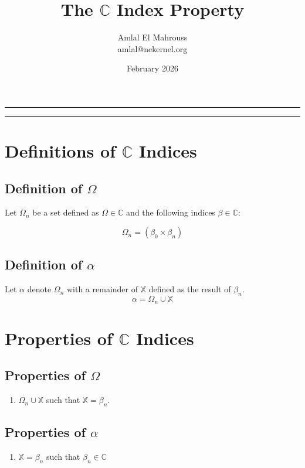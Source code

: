 \documentclass[11pt, a4paper]{article}
\title{The $\mathbb{C}$ Index Property}
\author{Amlal El Mahrouss\\amlal@nekernel.org}
\date{February 2026}
\begin{document}
\bf
\maketitle
\begin{center}
	\rule[0.01cm]{17cm}{0.01cm}
\end{center}
\begin{center}
	\rule[0.01cm]{17cm}{0.01cm}
\end{center}

\section{Definitions of $\mathbb{C}$ Indices}

\subsection{Definition of $\Omega$}

Let $\Omega_{n}$ be a set defined as $\Omega \in \mathbb{C}$ and the following indices $\beta \in \mathbb{C}$:

\begin{equation}
	\Omega_{n} = (\beta_{0} \times \beta_{n})
\end{equation}

\subsection{Definition of $\alpha$}

Let $\alpha$ denote $\Omega_{n}$ with a remainder of $\mathbb{X}$ defined as the result of $\beta_{n}$.
\begin{equation}
	\alpha = \Omega_{n} \cup \mathbb{X}
\end{equation}

\section{Properties of $\mathbb{C}$ Indices}

\subsection{Properties of $\Omega$}

\begin{enumerate}
	\item $\Omega_{n} \cup \mathbb{X}$ such that $\mathbb{X} = \beta_{n}$.
\end{enumerate}

\subsection{Properties of $\alpha$}

\begin{enumerate}

	\item $\mathbb{X} = \beta_{n}$ such that $\beta_{n} \in \mathbb{C}$
	
\end{enumerate}
\end{document}
